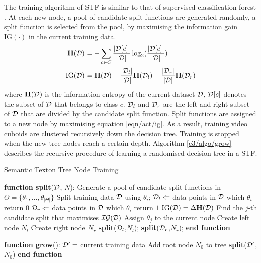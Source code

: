 The training algorithm of STF is similar to that of supervised classification forest \cite{Breiman2001}. At each new node, a pool of candidate split functions are generated randomly, a split function is selected from the pool, by maximising the information gain $\mathrm{IG}(\cdot)$ in the current training data. 
\begin{equation}
	\begin{aligned}
		\mathbf{H}(\mathcal{D}) & = -\sum_{c \in C} \frac{|\mathcal{D}[c]|}{|\mathcal{D}|}\log_{2}(\frac{|\mathcal{D}[c]|}{|\mathcal{D}|})\\ 
		\mathrm{IG}(\mathcal{D}) & = \mathbf{H}(\mathcal{D}) - \frac{|\mathcal{D}_{l}|}{|\mathcal{D}|}\mathbf{H}(\mathcal{D}_{l}) - \frac{|\mathcal{D}_{r}|}{|\mathcal{D}|}\mathbf{H}(\mathcal{D}_{r})
	\end{aligned}
	\label{eqn/act/ig}
\end{equation}
where $\mathbf{H}(\mathcal{D})$ is the information entropy of the current dataset $\mathcal{D}$, $\mathcal{D}[c]$ denotes the subset of $\mathcal{D}$ that belongs to class $c$. $\mathcal{D}_{l}$ and $\mathcal{D}_{r}$ are the left and right subset of $\mathcal{D}$ that are divided by the candidate split function. 
Split functions are assigned to a new node by maximising equation \ref{eqn/act/ig}. As a result, training video cuboids are clustered recursively down the decision tree. Training is stopped when the new tree nodes reach a certain depth. Algorithm \ref{c3/algo/grow} describes the recursive procedure of learning a randomised decision tree in a STF.

\begin{algorithm}
\caption{Semantic Texton Tree Node Training}
\label{c3/algo/grow}
\begin{algorithmic}
	\STATE \hspace{-2em} \textbf{function split}($\mathcal{D}$, $N$):
	\STATE Generate a pool of candidate split functions in $\Theta = \{ \theta_{1},\dots,\theta_{|\Theta|}\}$
	\STATE Split training data $\mathcal{D}$ using $\theta_i$;
	\STATE $\mathcal{D}_l \Leftarrow$ data points in $\mathcal{D}$ which $\theta_i$ return $0$
	\STATE $\mathcal{D}_r \Leftarrow$ data points in $\mathcal{D}$ which $\theta_i$ return $1$
	\STATE $\mathrm{IG}(\mathcal{D}) = \Delta\mathbf{H}(\mathcal{D})$ 
	\ENDFOR
	\STATE Find the $j$-th candidate split that maximises $\mathcal{IG}(\mathcal{D})$
	\STATE Assign $\theta_j$ to the current node 
		\STATE Create left node $N_l$
		\STATE Create right node $N_r$
		\STATE \textbf{split}($\mathcal{D}_l$,$N_l$);
		\STATE \textbf{split}($\mathcal{D}_r$,$N_r$);
	\ENDIF
	\STATE \hspace{-2em} \textbf{end function}
\end{algorithmic}
\begin{algorithmic}
	\STATE \hspace{-2em} \textbf{function grow}():
	\STATE $\mathcal{D}' = $ current training data
	\STATE Add root node $N_{0}$ to tree
	\STATE \textbf{split}($\mathcal{D}'$, $N_{0}$)
	\STATE \hspace{-2em} \textbf{end function}
\end{algorithmic}
\end{algorithm}


